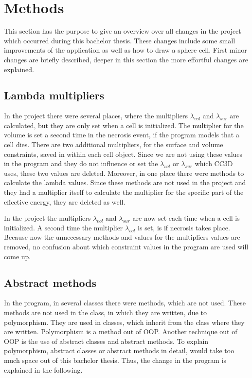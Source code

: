 \chapter{Methods}
    
This section has the purpose to give an overview over all changes in the project which occurred during this bachelor thesis. These changes include some small improvements of the application as well as how to draw a sphere cell. First minor changes are briefly described, deeper in this section the more effortful changes are explained. 

\section{Lambda multipliers}
In the project there were several places, where the multipliers $\lambda_{vol}$ and $\lambda_{sur}$ are calculated, but they are only set when a cell is initialized. The multiplier for the volume is set a second time in the necrosis event, if the program models that a cell dies. \newline
There are two additional multipliers, for the surface and volume constraints, saved in within each cell object. Since we are not using these values in the program and they do not influence or set the $\lambda_{vol}$ or $\lambda_{sur}$ which \ac{CC3D} uses, these two values are deleted. Moreover, in one place there were methods to calculate the lambda values. Since these methods are not used in the project and they had a multiplier itself to calculate the multiplier for the specific part of the effective energy, they are deleted as well. 

In the project the multipliers $\lambda_{vol}$ and $\lambda_{sur}$ are now set each time when a cell is initialized. A second time the multiplier $\lambda_{vol}$ is set, is if necrosis takes place. Because now the unnecessary methods and values for the multipliers values are removed, no confusion about which constraint values in the program are used will come up.

\section{Abstract methods}
In the program, in several classes there were methods, which are not used. These methods are not used in the class, in which they are written, due to polymorphism. They are used in classes, which inherit from the class where they are written. Polymorphism is a method out of \ac{OOP}. Another technique out of \ac{OOP} is the use of abstract classes and abstract methods. To explain polymorphism, abstract classes or abstract methods in detail, would take too much space out of this bachelor thesis. Thus, the change in the program is explained in the following.

